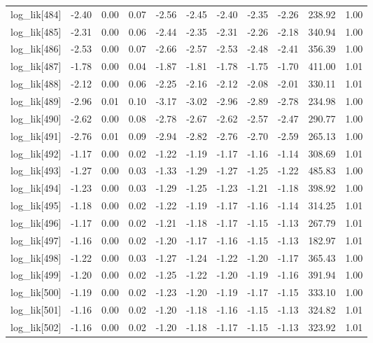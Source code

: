 \begin{table}[ht]
\begin{tabular}{rrrrrrrrrrr}
  log\_lik[484] & -2.40 & 0.00 & 0.07 & -2.56 & -2.45 & -2.40 & -2.35 & -2.26 & 238.92 & 1.00 \\ 
  log\_lik[485] & -2.31 & 0.00 & 0.06 & -2.44 & -2.35 & -2.31 & -2.26 & -2.18 & 340.94 & 1.00 \\ 
  log\_lik[486] & -2.53 & 0.00 & 0.07 & -2.66 & -2.57 & -2.53 & -2.48 & -2.41 & 356.39 & 1.00 \\ 
  log\_lik[487] & -1.78 & 0.00 & 0.04 & -1.87 & -1.81 & -1.78 & -1.75 & -1.70 & 411.00 & 1.01 \\ 
  log\_lik[488] & -2.12 & 0.00 & 0.06 & -2.25 & -2.16 & -2.12 & -2.08 & -2.01 & 330.11 & 1.01 \\ 
  log\_lik[489] & -2.96 & 0.01 & 0.10 & -3.17 & -3.02 & -2.96 & -2.89 & -2.78 & 234.98 & 1.00 \\ 
  log\_lik[490] & -2.62 & 0.00 & 0.08 & -2.78 & -2.67 & -2.62 & -2.57 & -2.47 & 290.77 & 1.00 \\ 
  log\_lik[491] & -2.76 & 0.01 & 0.09 & -2.94 & -2.82 & -2.76 & -2.70 & -2.59 & 265.13 & 1.00 \\ 
  log\_lik[492] & -1.17 & 0.00 & 0.02 & -1.22 & -1.19 & -1.17 & -1.16 & -1.14 & 308.69 & 1.01 \\ 
  log\_lik[493] & -1.27 & 0.00 & 0.03 & -1.33 & -1.29 & -1.27 & -1.25 & -1.22 & 485.83 & 1.00 \\ 
  log\_lik[494] & -1.23 & 0.00 & 0.03 & -1.29 & -1.25 & -1.23 & -1.21 & -1.18 & 398.92 & 1.00 \\ 
  log\_lik[495] & -1.18 & 0.00 & 0.02 & -1.22 & -1.19 & -1.17 & -1.16 & -1.14 & 314.25 & 1.01 \\ 
  log\_lik[496] & -1.17 & 0.00 & 0.02 & -1.21 & -1.18 & -1.17 & -1.15 & -1.13 & 267.79 & 1.01 \\ 
  log\_lik[497] & -1.16 & 0.00 & 0.02 & -1.20 & -1.17 & -1.16 & -1.15 & -1.13 & 182.97 & 1.01 \\ 
  log\_lik[498] & -1.22 & 0.00 & 0.03 & -1.27 & -1.24 & -1.22 & -1.20 & -1.17 & 365.43 & 1.00 \\ 
  log\_lik[499] & -1.20 & 0.00 & 0.02 & -1.25 & -1.22 & -1.20 & -1.19 & -1.16 & 391.94 & 1.00 \\ 
  log\_lik[500] & -1.19 & 0.00 & 0.02 & -1.23 & -1.20 & -1.19 & -1.17 & -1.15 & 333.10 & 1.00 \\ 
  log\_lik[501] & -1.16 & 0.00 & 0.02 & -1.20 & -1.18 & -1.16 & -1.15 & -1.13 & 324.82 & 1.01 \\ 
  log\_lik[502] & -1.16 & 0.00 & 0.02 & -1.20 & -1.18 & -1.17 & -1.15 & -1.13 & 323.92 & 1.01 \\ 

\end{tabular}
\end{table}
